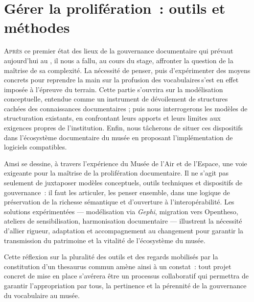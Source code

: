 \chapter[Gérer la prolifération]{\label{III-A} Gérer la prolifération~: outils et méthodes}




\lettrine{A}{près} ce premier état des lieux de la gouvernance documentaire qui prévaut aujourd’hui au \mae, il nous a fallu, au cours du stage, affronter la question de la maîtrise de sa complexité. La nécessité de penser, puis d’expérimenter des moyens concrets pour reprendre la main sur la profusion des vocabulaires s'est en effet imposée à l'épreuve du terrain. Cette partie s’ouvrira sur la modélisation conceptuelle, entendue comme un instrument de dévoilement de structures cachées des connaissances documentaires ; puis nous interrogerons les modèles de structuration existants, en confrontant leurs apports et leurs limites aux exigences propres de l’institution. Enfin, nous tâcherons de situer ces dispositifs dans l’écosystème documentaire du musée en proposant l'implémentation de logiciels compatibles.







\bigskip
\bigskip
\bigskip

\lettrine{A}insi se dessine, à travers l’expérience du Musée de l’Air et de l’Espace, une voie exigeante pour la maîtrise de la prolifération documentaire. Il ne s’agit pas seulement de juxtaposer modèles conceptuels, outils techniques et dispositifs de gouvernance~: il faut les articuler, les penser ensemble, dans une logique de préservation de la richesse sémantique et d’ouverture à l’interopérabilité. Les solutions expérimentées — modélisation via \textit{Gephi}, migration vers Opentheso, ateliers de sensibilisation, harmonisation documentaire — illustrent la nécessité d’allier rigueur, adaptation et accompagnement au changement pour garantir la transmission du patrimoine et la vitalité de l’écosystème du musée.

Cette réflexion sur la pluralité des outils et des regards mobilisés par la constitution d'un \gls{thesaurus} commun amène ainsi à un constat~: tout projet concret de mise en place s’avérera être un processus collaboratif qui permettra de garantir l'appropriation par tous, la pertinence et la pérennité de la gouvernance du vocabulaire au musée.